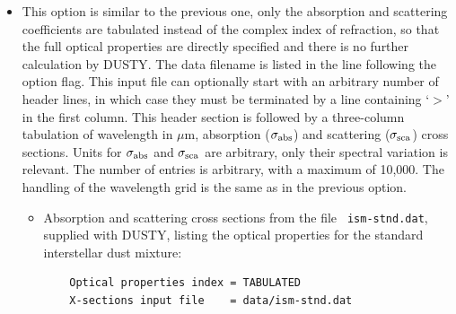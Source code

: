 \documentclass[11pt]{article}
\def\D    {{\sf DUSTY}}
\def\mic    {\hbox{$\mu$m}}
\begin{document}
\begin{itemize}
  \begin{itemize}
  \item Draine \& Lee graphite grains with three additional grain
    types whose {\tt n} and {\tt k} are provided by the user in data
    files {\tt amC-zb1.nk}, {\tt amC-zb2.nk} and {\tt amC-zb3.nk},
    distributed with DUSTY.  These files tabulate the most recent
    properties for amorphous carbon by Zubko et al \cite{Zubko}:

\begin{verbatim}
   Optical properties index = COMMON_AND_ADDL_GRAIN
   Abundances of built-in grain types:
         Sil-Ow  Sil-Oc  Sil-DL  grf-DL amC-Hn SiC-Pg
     x =  0.00    0.00    0.00    0.22   0.00  0.00

   Number of additional components = 3, properties listed in files
                     amC-zb1.nk
                     amC-zb2.nk
                     amC-zb3.nk
   Abundances for these components = 0.45, 0.10, 0.23
\end{verbatim}
  \end{itemize}

\item This option is similar to the previous one, only the absorption
  and scattering coefficients are tabulated instead of the complex
  index of refraction, so that the full optical properties are
  directly specified and there is no further calculation by \D.  The
  data filename is listed in the line following the option flag. This
  input file can optionally start with an arbitrary number of header
  lines, in which case they must be terminated by a line containing
  `$>$' in the first column. This header section is followed by a
  three-column tabulation of wavelength in \mic, absorption
  ($\sigma_{\rm abs}$) and scattering ($\sigma_{\rm sca}$) cross
  sections. Units for $\sigma_{\rm abs}$ and $\sigma_{\rm sca}$ are
  arbitrary, only their spectral variation is relevant. The number of
  entries is arbitrary, with a maximum of 10,000. The handling of the
  wavelength grid is the same as in the previous option.

  \begin{itemize}
  \item Absorption and scattering cross sections from the file {\tt
      ism-stnd.dat}, supplied with \D, listing the optical properties
    for the standard interstellar dust mixture:

\begin{verbatim}
    Optical properties index = TABULATED
    X-sections input file    = data/ism-stnd.dat
\end{verbatim}
  \end{itemize}

\end{itemize}
\end{document}
